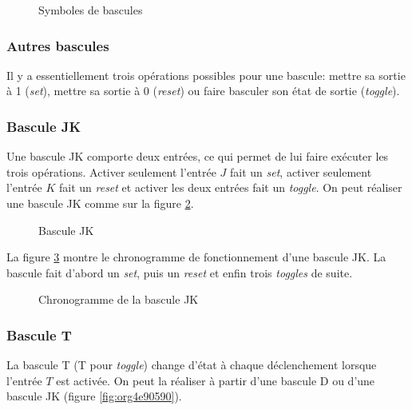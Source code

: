 \documentclass[11pt]{article}
\begin{document}
\begin{figure}[htbp]
\centering

\caption{\label{fig:orgad5dda6}Symboles de bascules}
\end{figure}

\subsubsection{Autres bascules}
\label{sec:orgc027a3f}

Il y a essentiellement trois opérations possibles pour une bascule:
mettre sa sortie à 1 (\emph{set}), mettre sa sortie à 0 (\emph{reset}) ou faire
basculer son état de sortie (\emph{toggle}).

\subsubsection{Bascule JK}
\label{sec:org76d9667}

Une bascule JK comporte deux entrées, ce qui permet de lui faire
exécuter les trois opérations. Activer seulement l'entrée \(J\) fait
un \emph{set}, activer seulement l'entrée \(K\) fait un \emph{reset} et activer
les deux entrées fait un \emph{toggle}. On peut réaliser une bascule JK
comme sur la figure \ref{fig:org308a7f2}.

\begin{figure}[htbp]
\centering

\caption{\label{fig:org308a7f2}Bascule JK}
\end{figure}

La figure \ref{fig:org594591b} montre le chronogramme de fonctionnement
d'une bascule JK. La bascule fait d'abord un \emph{set}, puis un \emph{reset} et
enfin trois \emph{toggles} de suite.

\begin{figure}[htbp]
\centering

\caption{\label{fig:org594591b}Chronogramme de la bascule JK}
\end{figure}

\subsubsection{Bascule T}
\label{sec:org5e8c8db}

La bascule T (T pour \emph{toggle}) change d'état à chaque déclenchement
lorsque l'entrée \(T\) est activée. On peut la réaliser à partir d'une
bascule D ou d'une bascule JK (figure \ref{fig:org4e90590}).
\end{document}
